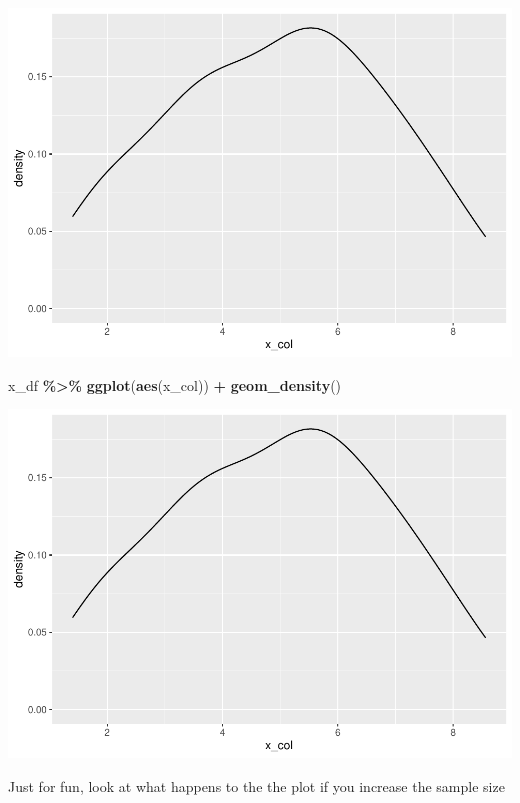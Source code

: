 \documentclass[
]{book}
\newenvironment{Shaded}{\begin{snugshade}}{\end{snugshade}}
\newcommand{\KeywordTok}[1]{\textcolor[rgb]{0.13,0.29,0.53}{\textbf{#1}}}
\newcommand{\NormalTok}[1]{#1}
\newcommand{\OperatorTok}[1]{\textcolor[rgb]{0.81,0.36,0.00}{\textbf{#1}}}
\newcommand{\StringTok}[1]{\textcolor[rgb]{0.31,0.60,0.02}{#1}}
\begin{document}
\includegraphics{test_course_notes_files/figure-latex/unnamed-chunk-13-2.pdf}

\begin{Shaded}
\begin{Highlighting}[]
\NormalTok{x\_df }\OperatorTok{\%\textgreater{}\%}
\StringTok{  }\KeywordTok{ggplot}\NormalTok{(}\KeywordTok{aes}\NormalTok{(x\_col)) }\OperatorTok{+}
\StringTok{  }\KeywordTok{geom\_density}\NormalTok{()}
\end{Highlighting}
\end{Shaded}

\includegraphics{test_course_notes_files/figure-latex/unnamed-chunk-13-3.pdf}

Just for fun, look at what happens to the the plot if you increase the sample size
\end{document}
